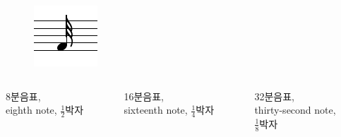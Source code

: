 \documentclass{beamer}
\begin{document}
\begin{frame}
\begin{columns}
\begin{column}{0.33\textwidth}
\begin{figure}[h!]
					\includegraphics[width=0.7\columnwidth]{res/pdf/4/note/thirty-second.pdf}
				\end{figure}
			\end{column}
		\end{columns}
		\vskip -1pc
		\begin{columns}
			\begin{column}{0.33\textwidth}
				\centering
				\small 8분음표,\\eighth note, $\frac{1}{2}$박자
			\end{column}
			\begin{column}{0.33\textwidth}
				\centering
				\small 16분음표,\\sixteenth note, $\frac{1}{4}$박자
			\end{column}
			\begin{column}{0.33\textwidth}
				\centering
				\small 32분음표,\\thirty-second note,\\$\frac{1}{8}$박자
			\end{column}
		\end{columns}
	\end{frame}
	
\end{document}
